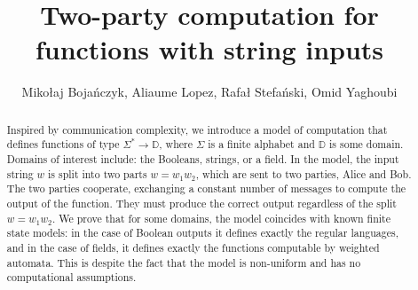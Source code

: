 \documentclass[11pt]{article}
\newcommand{\domain}{\mathbb D}
\begin{document}
\title{Two-party computation for functions with string inputs}
\author{Miko{\l}aj Boja\'nczyk, Aliaume Lopez, Rafa{\l} Stefa\'nski, Omid Yaghoubi }

\maketitle 
\begin{abstract}
 Inspired by communication complexity, we introduce a model of computation that defines functions of type $\Sigma^* \to \domain$, where $\Sigma$ is a finite alphabet and $\domain$ is some domain. Domains of interest include: the Booleans, strings, or a field. In the model, the input string $w$ is split into two parts $w=w_1 w_2$, which are sent to two parties, Alice and Bob. The two parties cooperate, exchanging a constant number of messages to compute the output of the function. They must produce the correct output regardless of the split $w = w_1 w_2$. We prove that for some domains, the model coincides with known finite state models: in the case of Boolean outputs it defines exactly the regular languages, and in the case of fields, it defines exactly the functions computable by weighted automata. This is despite the fact that the model is non-uniform and has no computational assumptions. 
\end{abstract}















\end{document}
